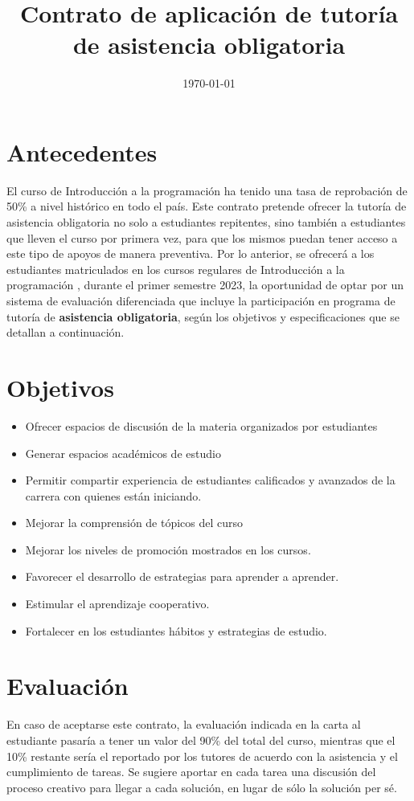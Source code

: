 \documentclass[11pt]{proc}
\title{\textbf{Contrato de aplicación de tutoría de asistencia obligatoria}}
\date{\today}
\newcommand{\nombreCurso}{Introducción a la programación }
\newcommand{\periodo}{ primer semestre 2023}
\begin{document}
\maketitle
\section*{Antecedentes}

El curso de \nombreCurso ha tenido una tasa de reprobación de 50\% a nivel histórico en todo el país. Este contrato pretende ofrecer la tutoría de asistencia obligatoria no solo a estudiantes repitentes, sino también a estudiantes que lleven el curso por primera vez, para que los mismos puedan tener acceso a este tipo de apoyos de manera preventiva.  
Por lo anterior, se ofrecerá a los estudiantes matriculados en los cursos regulares de \nombreCurso, durante el \periodo, la oportunidad de optar por un sistema de evaluación diferenciada que incluye la participación en programa de tutoría de \textbf{asistencia obligatoria}, según los objetivos y especificaciones que se detallan a continuación. 

\section*{Objetivos}
\begin{itemize}
\item Ofrecer espacios de discusión de la materia organizados por estudiantes
\item Generar espacios académicos de estudio
\item Permitir compartir experiencia de estudiantes calificados y avanzados de la carrera con quienes están iniciando.
\item Mejorar la comprensión de tópicos del curso
\item Mejorar los niveles de promoción mostrados en los cursos.
\item Favorecer el desarrollo de estrategias para aprender a aprender.
\item Estimular el aprendizaje cooperativo. 
\item Fortalecer en los estudiantes hábitos y estrategias de estudio.
\end{itemize}

\section*{Evaluación}
En caso de aceptarse este contrato, la evaluación indicada en la carta al estudiante pasaría a tener un valor del 90\% del total del curso, mientras que el 10\% restante sería el reportado por los tutores de acuerdo con la asistencia y el cumplimiento de tareas. Se sugiere aportar en cada tarea una discusión del proceso creativo para llegar a cada solución, en lugar de sólo la solución per sé. 
\end{document}
